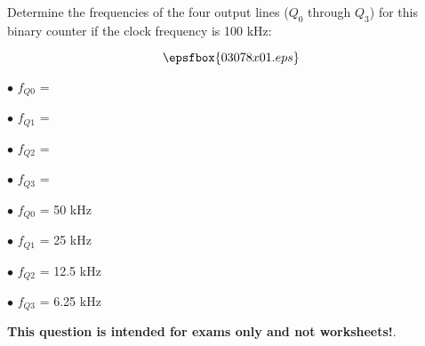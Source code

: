 

Determine the frequencies of the four output lines ($Q_0$ through $Q_3$) for this binary counter if the clock frequency is 100 kHz:

$$\epsfbox{03078x01.eps}$$

\medskip
\item{$\bullet$} $f_{Q0}$ =
\item{$\bullet$} $f_{Q1}$ =
\item{$\bullet$} $f_{Q2}$ =
\item{$\bullet$} $f_{Q3}$ =
\medskip







\medskip
\item{$\bullet$} $f_{Q0}$ = 50 kHz
\item{$\bullet$} $f_{Q1}$ = 25 kHz
\item{$\bullet$} $f_{Q2}$ = 12.5 kHz
\item{$\bullet$} $f_{Q3}$ = 6.25 kHz
\medskip







{\bf This question is intended for exams only and not worksheets!}.




